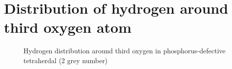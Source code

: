 \documentclass[11pt]{article}
\begin{document}
\section{Distribution of hydrogen around third oxygen atom}

\begin{figure}[H]
\begin{minipage}[h]{0.5\linewidth}
\end{minipage}
\hfill
\begin{minipage}[h]{0.5\linewidth}
\end{minipage}
\caption{Hydrogen distribution around third oxygen in phosphorus-defective tetraherdal (2 grey number)}
\label{HinO1,2and3}
\end{figure}
\end{document}
